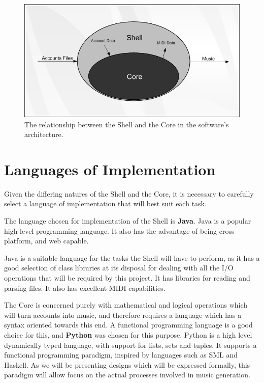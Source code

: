 \begin{figure}[ht]
\centering
\includegraphics[scale=1.5]{shellcore}
\caption{The relationship between the Shell and the Core in the software's architecture.}
\label{fig:shellcore}
\end{figure}

\section{Languages of Implementation}

Given the differing natures of the Shell and the Core, it is necessary to carefully select a language of implementation that will best suit each task. 

The language chosen for implementation of the Shell is \textbf{Java}. Java is a popular high-level programming language. It also has the advantage of being cross-platform, and web capable.

Java is a suitable language for the tasks the Shell will have to perform, as it has a good selection of class libraries at its disposal for dealing with all the I/O operations that will be required by this project. It has libraries for reading and parsing files. It also has excellent MIDI capabilities.

The Core is concerned purely with mathematical and logical operations which will turn accounts into music, and therefore requires a language which has a syntax oriented towards this end. A functional programming language is a good choice for this, and \textbf{Python} was chosen for this purpose. Python is a high level dynamically typed language, with support for lists, sets and tuples. It supports a functional programming paradigm, inspired by languages such as SML and Haskell. As we will be presenting designs which will be expressed formally, this paradigm will allow focus on the actual processes involved in music generation.

